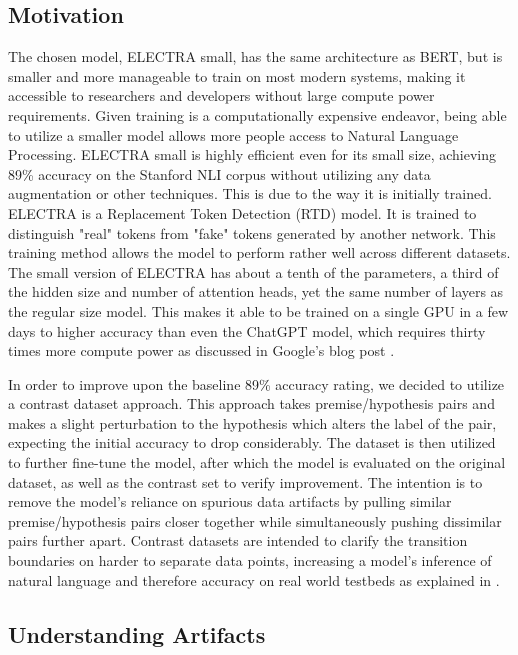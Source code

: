 \documentclass[11pt]{article}
\begin{document}
\subsection{Motivation}

The chosen model, ELECTRA small, has the same architecture as BERT, but is smaller and more manageable to train on most modern systems, making it accessible to researchers and developers without large compute power requirements. Given training is a computationally expensive endeavor, being able to utilize a smaller model allows more people access to Natural Language Processing. ELECTRA small is highly efficient even for its small size, achieving 89\% accuracy on the Stanford NLI corpus without utilizing any data augmentation or other techniques. This is due to the way it is initially trained. ELECTRA is a Replacement Token Detection (RTD) model. It is trained to distinguish "real" tokens from "fake" tokens generated by another network. This training method allows the model to perform rather well across different datasets.  The small version of ELECTRA has about a tenth of the parameters, a third of the hidden size and number of attention heads, yet the same number of layers as the regular size model. This makes it able to be trained on a single GPU in a few days to higher accuracy than even the ChatGPT model, which requires thirty times more compute power as discussed in Google's blog post \citealp{googleelectrablog}.

In order to improve upon the baseline 89\% accuracy rating, we decided to utilize a contrast dataset approach. This approach takes premise/hypothesis pairs and makes a slight perturbation to the hypothesis which alters the label of the pair, expecting the initial accuracy to drop considerably.  The dataset is then utilized to further fine-tune the model, after which the model is evaluated on the original dataset, as well as the contrast set to verify improvement. The intention is to remove the model's reliance on spurious data artifacts by pulling similar premise/hypothesis pairs closer together while simultaneously pushing dissimilar pairs further apart. Contrast datasets are intended to clarify the transition boundaries on harder to separate data points, increasing a model's inference of natural language and therefore accuracy on real world testbeds as explained in \citealp{localdecisionboundaries}.

\subsection{Understanding Artifacts}
\end{document}
